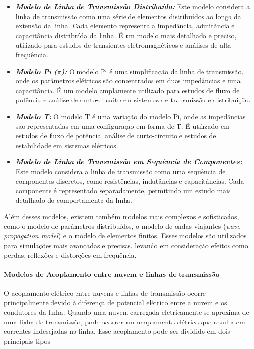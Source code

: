 \documentclass[a4paper, 12pt, onecolumn,singlespacing]{article}
\begin{document}
	\begin{itemize}
		\item \textbf{\textit{Modelo de Linha de Transmissão Distribuída:}} Este modelo considera a linha de transmissão como uma série de elementos distribuídos ao longo da extensão da linha. Cada elemento representa a impedância, admitância e capacitância distribuída da linha. É um modelo mais detalhado e preciso, utilizado para estudos de transientes eletromagnéticos e análises de alta frequência.
		
		\item \textbf{\textit{Modelo Pi ($\pi$):}} O modelo Pi é uma simplificação da linha de transmissão, onde os parâmetros elétricos são concentrados em duas impedâncias e uma capacitância. É um modelo amplamente utilizado para estudos de fluxo de potência e análise de curto-circuito em sistemas de transmissão e distribuição.
		
		\item \textbf{\textit{Modelo T:}} O modelo T é uma variação do modelo Pi, onde as impedâncias são representadas em uma configuração em forma de T. É utilizado em estudos de fluxo de potência, análise de curto-circuito e estudos de estabilidade em sistemas elétricos.
		
		\item \textbf{\textit{Modelo de Linha de Transmissão em Sequência de Componentes:}} Este modelo considera a linha de transmissão como uma sequência de componentes discretos, como resistências, indutâncias e capacitâncias. Cada componente é representado separadamente, permitindo um estudo mais detalhado do comportamento da linha.
	\end{itemize}
	
	Além desses modelos, existem também modelos mais complexos e sofisticados, como o modelo de parâmetros distribuídos, o modelo de ondas viajantes (\textit{wave propagation model}) e o modelo de elementos finitos. Esses modelos são utilizados para simulações mais avançadas e precisas, levando em consideração efeitos como perdas, reflexões e distorções em frequência.
	
	\paragraph{Modelos de Acoplamento entre nuvem e linhas de transmissão}
	
			O acoplamento elétrico entre nuvens e linhas de transmissão ocorre principalmente devido à diferença de potencial elétrico entre a nuvem e os condutores da linha. Quando uma nuvem carregada eletricamente se aproxima de uma linha de transmissão, pode ocorrer um acoplamento elétrico que resulta em correntes indesejadas na linha. Esse acoplamento pode ser dividido em dois principais tipos:
	
\end{document}
